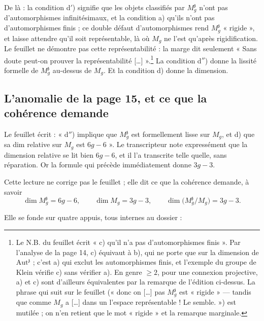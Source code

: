 \documentclass[11pt,a4paper]{article}
\begin{document}
De là : la condition d$'$) signifie que les objets classifiés par
$M_g^{\mathfrak{z}}$ n'ont pas d'automorphismes infinitésimaux, et la
condition a) qu'ils n'ont pas d'automorphismes finis ; ce double défaut
d'automorphismes rend $M_g^{\mathfrak{z}}$ « rigide », et laisse attendre
qu'il soit représentable, là où $M_g$ ne l'est qu'après rigidification. Le
feuillet ne démontre pas cette représentabilité : la marge dit seulement
« Sans doute peut-on prouver la représentabilité [\ldots] ».\footnote{Le
N.B. du feuillet écrit « c) qu'il n'a pas d'automorphismes finis ». Par
l'analyse de la page 14, c) équivaut à b), qui ne porte que sur la dimension
de $\mathrm{Aut}^{\mathfrak{z}}$ ; c'est a) qui exclut les automorphismes
finis, et l'exemple du groupe de Klein vérifie c) sans vérifier a). En genre
$\geqslant 2$, pour une connexion projective, a) et c) sont d'ailleurs
équivalentes par la remarque de l'édition ci-dessus. La phrase qui suit sur le
feuillet (« donc on [\ldots] pas $M_g^{\mathfrak{z}}$ est « rigide » ---
tandis que comme $M_g$ a [\ldots] dans un l'espace représentable ! Le
semble. ») est mutilée ; on n'en retient que le mot « rigide » et la
remarque marginale.} La condition d$''$) donne la lissité formelle de
$M_g^{\mathfrak{z}}$ au-dessus de $M_g$. Et la condition d) donne la
dimension.

\subsection*{L'anomalie de la page 15, et ce que la cohérence demande}

Le feuillet écrit : « d$''$) implique que $M_g^{\mathfrak{z}}$ est
formellement lisse sur $M_g$, et d) que sa dim relative sur $M_g$ est
$6g-6$ ». Le transcripteur note expressément que la dimension relative se lit
bien $6g-6$, et il l'a transcrite telle quelle, sans réparation. Or la
formule qui précède immédiatement donne $3g-3$.

Cette lecture ne corrige pas le feuillet ; elle dit ce que la cohérence
demande, à savoir
\[
  \dim M_g^{\mathfrak{z}} = 6g-6, \qquad \dim M_g = 3g-3, \qquad
  \dim \big( M_g^{\mathfrak{z}} / M_g \big) = 3g-3 .
\]

Elle se fonde sur quatre appuis, tous internes au dossier :
\end{document}
